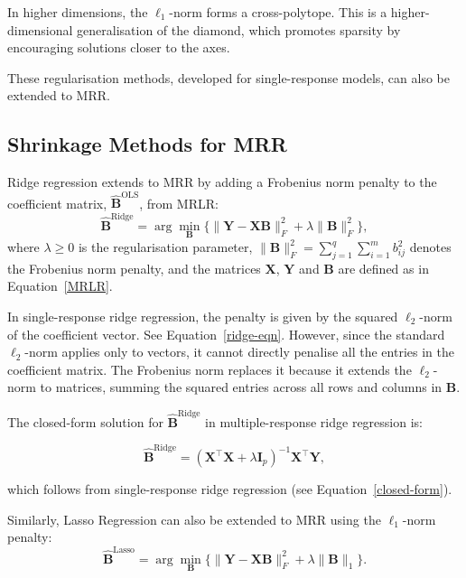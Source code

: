 \documentclass[11pt]{report} %
\begin{document}
In higher dimensions, the \( \ell_1 \)-norm forms a cross-polytope. This is a higher-dimensional generalisation of the diamond, which promotes sparsity by encouraging solutions closer to the axes.

These regularisation methods, developed for single-response models, can also be extended to MRR.

\subsection{Shrinkage Methods for MRR}
\label{SMs for MRR}
Ridge regression extends to MRR by adding a Frobenius norm penalty to the coefficient matrix, \(\mathbf{\hat{B}}^{\text{OLS}}\), from MRLR: 
\begin{equation}
\hat{\mathbf{B}}^\text{Ridge}=\arg\min_{\mathbf{B}}  \{\|\mathbf{Y} - \mathbf{XB}\|_F^2 + \lambda \|\mathbf{B}\|_F^2\},
    \label{multi-ridge-eqn}
\end{equation}
\noindent where $\lambda \geq 0$ is the regularisation parameter, \(\|\mathbf{B}\|_F^2 = \sum_{j=1}^{q} \sum_{i=1}^{m} b_{ij}^2\) denotes the Frobenius norm penalty, and the matrices $\mathbf{X}$, $\mathbf{Y}$ and $\mathbf{B}$ are defined as in Equation~\ref{MRLR}.\cite{mukherjee2011reduced}

In single-response ridge regression, the penalty is given by the squared \(\ell_2\)-norm of the coefficient vector. See Equation~\ref{ridge-eqn}. However, since the standard \(\ell_2\)-norm applies only to vectors, it cannot directly penalise all the entries in the coefficient matrix. The Frobenius norm replaces it because it extends the \(\ell_2\)-norm to matrices, summing the squared entries across all rows and columns in \(\mathbf{B}\).%

The closed-form solution for \(\mathbf{\hat{B}}^\text{Ridge}\) in multiple-response ridge regression is:

\begin{equation}
    \mathbf{\hat{B}}^\text{Ridge} = (\mathbf{X}^\top\mathbf{X} + \lambda \mathbf{I}_p)^{-1} \mathbf{X}^\top\mathbf{Y},
    \label{ridge}
\end{equation}

\noindent which follows from single-response ridge regression (see Equation~\ref{closed-form}).

Similarly, Lasso Regression can also be extended to MRR using the \(\ell_1\)-norm penalty: 
\begin{equation}
    \hat{\mathbf{B}}^\text{Lasso}=\arg\min_{\mathbf{B}} \{ \|\mathbf{Y} - \mathbf{XB}\|_F^2 + \lambda \|\mathbf{B}\|_1\}.
    \label{lasso mrr}
\end{equation}
\end{document}
